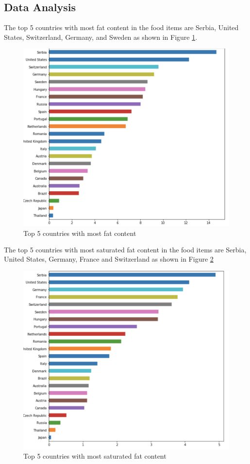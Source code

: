 \documentclass[sigconf]{acmart}
\begin{document}
\subsection{Data Analysis}
The top 5 countries with most fat content in the food items are Serbia, United States, Switzerland, Germany, and Sweden as shown in Figure \ref{fig:Fig8}.
	
\begin{figure}
\includegraphics[width=1.0\columnwidth]{images/fig8.png}
\caption{Top 5 countries with most fat content \cite{code-base}}
\label{fig:Fig8}
\end{figure}

The top 5 countries with most saturated fat content in the food items are Serbia, United States, Germany, France and Switzerland as shown in Figure \ref{fig:Fig9}
	
\begin{figure}
\includegraphics[width=1.0\columnwidth]{images/fig9.png}
\caption{Top 5 countries with most saturated fat content \cite{code-base}}
\label{fig:Fig9}
\end{figure}
\end{document}
